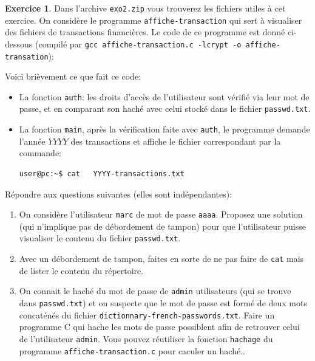 \documentclass[a4paper,9pt]{article}
\theoremstyle{plain}
\theoremstyle{definition}
\newtheorem{exercice}{Exercice}
\begin{document}
\begin{exercice}
  Dans l'archive \verb|exo2.zip| vous trouverez les fichiers utiles à cet exercice. On considère le programme \verb|affiche-transaction| qui sert à visualiser des fichiers de transactions financières. Le code de ce programme est donné ci-dessous (compilé par \verb|gcc affiche-transaction.c -lcrypt -o affiche-transation|):
  \begin{small}
    
    \end{small}
% 
% 
%
% 

Voici brièvement ce que fait ce code:
\begin{itemize}
\item La fonction \verb|auth|: les  droits d'accès de l'utilisateur sont vérifié via leur mot de passe, et en comparant son haché avec celui stocké dans le fichier \verb|passwd.txt|.
\item La fonction \verb|main|, après la vérification faite avec \verb|auth|, le programme demande l'année $YYYY$ des transactions et affiche le fichier correspondant par la commande:
\begin{verbatim}
user@pc:~$ cat   YYYY-transactions.txt
\end{verbatim}
\end{itemize}

Répondre aux questions suivantes (elles sont indépendantes):
\begin{enumerate}
\item On considère l'utilisateur \verb|marc| de mot de passe \verb|aaaa|. Proposez une solution (qui n'implique pas de débordement de tampon) pour que l'utilisateur puisse visualiser le contenu du fichier \verb|passwd.txt|.
  \item Avec un débordement de tampon, faites en sorte de ne pas faire de  \verb|cat| mais de lister le contenu du répertoire. 
\item On connait le haché du mot de passe de \verb|admin| utilisateurs (qui se trouve dans  \verb|passwd.txt|) et on suspecte que le mot de passe est formé de deux mots concaténés du fichier \verb|dictionnary-french-passwords.txt|. Faire un programme C qui hache les mots de passe possiblent afin de retrouver celui de l'utilisateur \verb|admin|. Vous pouvez réutiliser la fonction \verb|hachage| du programme \verb|affiche-transaction.c| pour caculer un haché..
  \end{enumerate}


\end{exercice}
\end{document}
